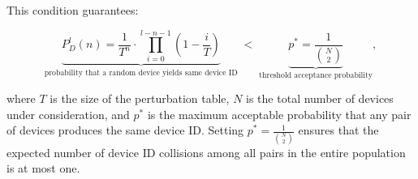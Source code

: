 \documentclass[twocolumn]{report}
\begin{document}

This condition guarantees:
\vspace{-1cm}
\begin{center}
    \begin{adjustbox}{max width=\columnwidth}
        \begin{minipage}[t]{0.5\textwidth}
            \[
                \underbrace{
                P_D^l(n)
                =
                \frac{1}{T^n}
                \cdot
                \prod_{i=0}^{l - n - 1}
                \left(1 - \frac{i}{T}\right)
                }_{\text{probability that a random device yields same device ID}}
                \;<\;
                \underbrace{
                p^* = \frac{1}{\binom{N}{2}}
                }_{\text{threshold acceptance probability}},
            \]
        \end{minipage}
    \end{adjustbox}
\end{center}

where \( T \) is the \alert{size of the perturbation table}, \( N \) is the \alert{total number of devices} under consideration, and \( p^* \) is the \alert{maximum acceptable probability} that any \alert{pair} of devices produces the same device ID. Setting \( p^* = \frac{1}{\binom{N}{2}} \) ensures that the expected number of device ID collisions among all pairs in the entire population is \alert{at most one}.
\end{document}
